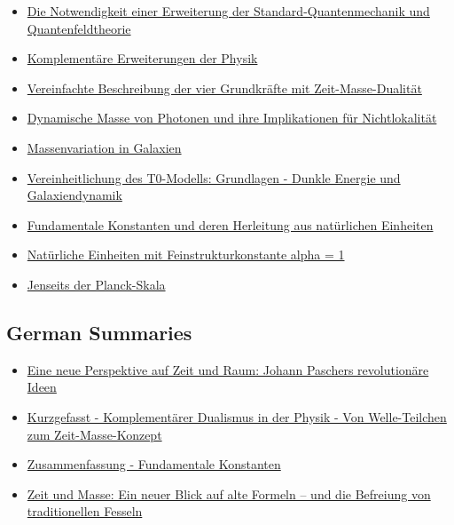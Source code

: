 \documentclass[a4paper,12pt]{article}
\newcommand{\repobase}{https://github.com/jpascher/T0-Time-Mass-Duality/tree/main/2/}
\begin{document}
	\begin{itemize}
		\item \href{\repobase pdf/Deutsch/Die Notwendigkeit einer Erweiterung der Standard-Quantenmechanik und Quantenfeldtheorie.pdf}{Die Notwendigkeit einer Erweiterung der Standard-Quantenmechanik und Quantenfeldtheorie}
		\item \href{\repobase pdf/Deutsch/Komplementäre Erweiterungen der Physik.pdf}{Komplementäre Erweiterungen der Physik}
		\item \href{\repobase pdf/Deutsch/Vereinfachte Beschreibung der vier Grundkräfte mit Zeit-Masse-Dualität.pdf}{Vereinfachte Beschreibung der vier Grundkräfte mit Zeit-Masse-Dualität}
		\item \href{\repobase pdf/Deutsch/Dynamische Masse von Photonen und ihre Implikationen für Nichtlokalität.pdf}{Dynamische Masse von Photonen und ihre Implikationen für Nichtlokalität}
		\item \href{\repobase pdf/Deutsch/Massenvariation in Galaxien.pdf}{Massenvariation in Galaxien}
		\item \href{\repobase pdf/Deutsch/Vereinheitlichung des T0-Modells Grundlagen - Dunkle Energie und Galaxiendynamik.pdf}{Vereinheitlichung des T0-Modells: Grundlagen - Dunkle Energie und Galaxiendynamik}
		\item \href{\repobase pdf/Deutsch/Fundamentale Konstanten und deren Herleitung aus natürlichen Einheiten.pdf}{Fundamentale Konstanten und deren Herleitung aus natürlichen Einheiten}
		\item \href{\repobase pdf/Deutsch/Natürliche Einheiten mit Feinstrukturkonstante alpha = 1.pdf}{Natürliche Einheiten mit Feinstrukturkonstante alpha = 1}
		\item \href{\repobase pdf/Deutsch/Jenseits der Planck-Skala.pdf}{Jenseits der Planck-Skala}
	\end{itemize}
	
	\subsection{German Summaries}
	
	\begin{itemize}
		\item \href{\repobase pdf/Deutsch kurzgefasst/Eine neue Perspektive auf Zeit und Raum Johann Paschers revolutionäre Ideen.pdf}{Eine neue Perspektive auf Zeit und Raum: Johann Paschers revolutionäre Ideen}
		\item \href{\repobase pdf/Deutsch kurzgefasst/Kurzgefasst - Komplementärer Dualismus in der Physik - Von Welle-Teilchen zum Zeit-Masse-Konzept.pdf}{Kurzgefasst - Komplementärer Dualismus in der Physik - Von Welle-Teilchen zum Zeit-Masse-Konzept}
		\item \href{\repobase pdf/Deutsch kurzgefasst/Zusammenfassung - Fundamentale Konstanten.pdf}{Zusammenfassung - Fundamentale Konstanten}
		\item \href{\repobase pdf/Deutsch kurzgefasst/Zeit und Masse Ein neuer Blick auf alte Formeln – und die Befreiung von traditionellen Fesseln.pdf}{Zeit und Masse: Ein neuer Blick auf alte Formeln – und die Befreiung von traditionellen Fesseln}
	\end{itemize}
	
\end{document}
